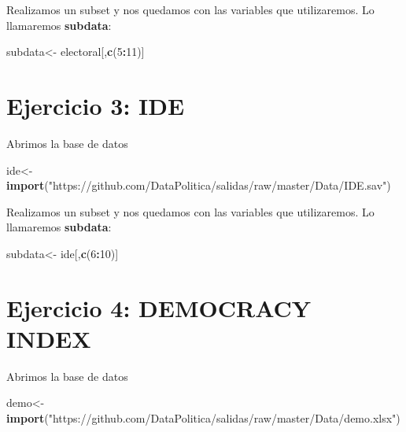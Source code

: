 \documentclass[
]{article}
\newenvironment{Shaded}{\begin{snugshade}}{\end{snugshade}}
\newcommand{\DecValTok}[1]{\textcolor[rgb]{0.00,0.00,0.81}{#1}}
\newcommand{\KeywordTok}[1]{\textcolor[rgb]{0.13,0.29,0.53}{\textbf{#1}}}
\newcommand{\NormalTok}[1]{#1}
\newcommand{\OperatorTok}[1]{\textcolor[rgb]{0.81,0.36,0.00}{\textbf{#1}}}
\newcommand{\StringTok}[1]{\textcolor[rgb]{0.31,0.60,0.02}{#1}}
\begin{document}
Realizamos un subset y nos quedamos con las variables que utilizaremos.
Lo llamaremos \textbf{subdata}:

\begin{Shaded}
\begin{Highlighting}[]
\NormalTok{subdata<-}\StringTok{ }\NormalTok{electoral[,}\KeywordTok{c}\NormalTok{(}\DecValTok{5}\OperatorTok{:}\DecValTok{11}\NormalTok{)]}
\end{Highlighting}
\end{Shaded}

\hypertarget{ejercicio-3-ide}{%
\section{Ejercicio 3: IDE}\label{ejercicio-3-ide}}

Abrimos la base de datos

\begin{Shaded}
\begin{Highlighting}[]
\NormalTok{ide<-}\StringTok{ }\KeywordTok{import}\NormalTok{(}\StringTok{"https://github.com/DataPolitica/salidas/raw/master/Data/IDE.sav"}\NormalTok{)}
\end{Highlighting}
\end{Shaded}

Realizamos un subset y nos quedamos con las variables que utilizaremos.
Lo llamaremos \textbf{subdata}:

\begin{Shaded}
\begin{Highlighting}[]
\NormalTok{subdata<-}\StringTok{ }\NormalTok{ide[,}\KeywordTok{c}\NormalTok{(}\DecValTok{6}\OperatorTok{:}\DecValTok{10}\NormalTok{)]}
\end{Highlighting}
\end{Shaded}

\hypertarget{ejercicio-4-democracy-index}{%
\section{Ejercicio 4: DEMOCRACY
INDEX}\label{ejercicio-4-democracy-index}}

Abrimos la base de datos

\begin{Shaded}
\begin{Highlighting}[]
\NormalTok{demo<-}\StringTok{ }\KeywordTok{import}\NormalTok{(}\StringTok{"https://github.com/DataPolitica/salidas/raw/master/Data/demo.xlsx"}\NormalTok{)}
\end{Highlighting}
\end{Shaded}
\end{document}
